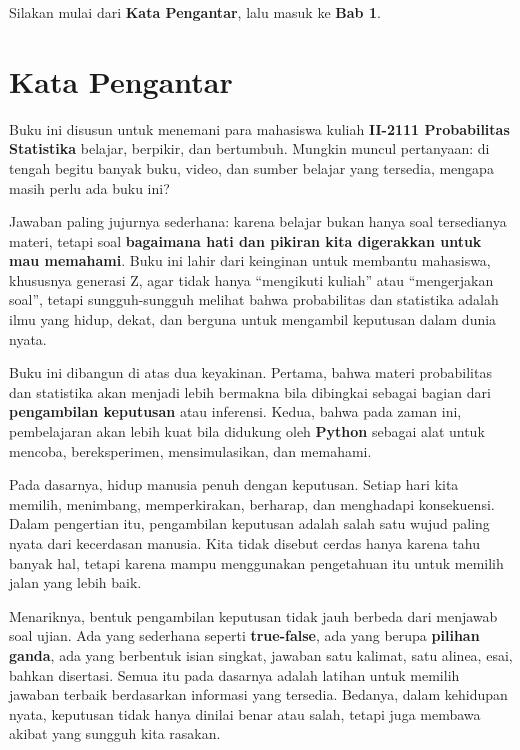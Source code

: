 \documentclass[
  letterpaper,
  DIV=11,
  numbers=noendperiod]{scrreprt}
\begin{document}
Silakan mulai dari \textbf{Kata Pengantar}, lalu masuk ke \textbf{Bab
1}.


\chapter{Kata Pengantar}\label{kata-pengantar}

Buku ini disusun untuk menemani para mahasiswa kuliah \textbf{II-2111
Probabilitas Statistika} belajar, berpikir, dan bertumbuh. Mungkin
muncul pertanyaan: di tengah begitu banyak buku, video, dan sumber
belajar yang tersedia, mengapa masih perlu ada buku ini?

Jawaban paling jujurnya sederhana: karena belajar bukan hanya soal
tersedianya materi, tetapi soal \textbf{bagaimana hati dan pikiran kita
digerakkan untuk mau memahami}. Buku ini lahir dari keinginan untuk
membantu mahasiswa, khususnya generasi Z, agar tidak hanya ``mengikuti
kuliah'' atau ``mengerjakan soal'', tetapi sungguh-sungguh melihat bahwa
probabilitas dan statistika adalah ilmu yang hidup, dekat, dan berguna
untuk mengambil keputusan dalam dunia nyata.

Buku ini dibangun di atas dua keyakinan. Pertama, bahwa materi
probabilitas dan statistika akan menjadi lebih bermakna bila dibingkai
sebagai bagian dari \textbf{pengambilan keputusan} atau inferensi.
Kedua, bahwa pada zaman ini, pembelajaran akan lebih kuat bila didukung
oleh \textbf{Python} sebagai alat untuk mencoba, bereksperimen,
mensimulasikan, dan memahami.

Pada dasarnya, hidup manusia penuh dengan keputusan. Setiap hari kita
memilih, menimbang, memperkirakan, berharap, dan menghadapi konsekuensi.
Dalam pengertian itu, pengambilan keputusan adalah salah satu wujud
paling nyata dari kecerdasan manusia. Kita tidak disebut cerdas hanya
karena tahu banyak hal, tetapi karena mampu menggunakan pengetahuan itu
untuk memilih jalan yang lebih baik.

Menariknya, bentuk pengambilan keputusan tidak jauh berbeda dari
menjawab soal ujian. Ada yang sederhana seperti \textbf{true-false}, ada
yang berupa \textbf{pilihan ganda}, ada yang berbentuk isian singkat,
jawaban satu kalimat, satu alinea, esai, bahkan disertasi. Semua itu
pada dasarnya adalah latihan untuk memilih jawaban terbaik berdasarkan
informasi yang tersedia. Bedanya, dalam kehidupan nyata, keputusan tidak
hanya dinilai benar atau salah, tetapi juga membawa akibat yang sungguh
kita rasakan.
\end{document}
